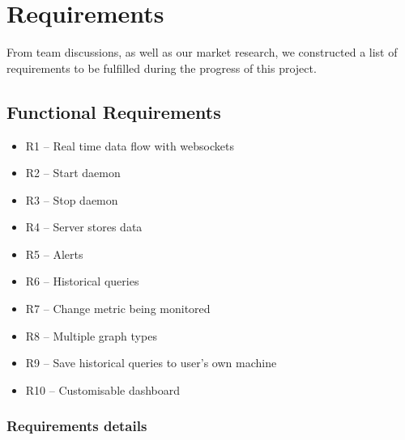 \documentclass{l3proj}
\begin{document}


\chapter{Requirements}
\label{req}

From team discussions, as well as our market research, we constructed a list of requirements to be fulfilled during the progress of this project.


\section{Functional Requirements}
\label{requirements}



\begin{itemize}
  \item R1 -- Real time data flow with websockets
  \item R2 -- Start daemon
  \item R3 -- Stop daemon
  \item R4 -- Server stores data
  \item R5 -- Alerts
  \item R6 -- Historical queries
  \item R7 -- Change metric being monitored
  \item R8 -- Multiple graph types
  \item R9 -- Save historical queries to user's own machine
  \item R10 -- Customisable dashboard
\end{itemize}

\subsection{Requirements details}
\end{document}
